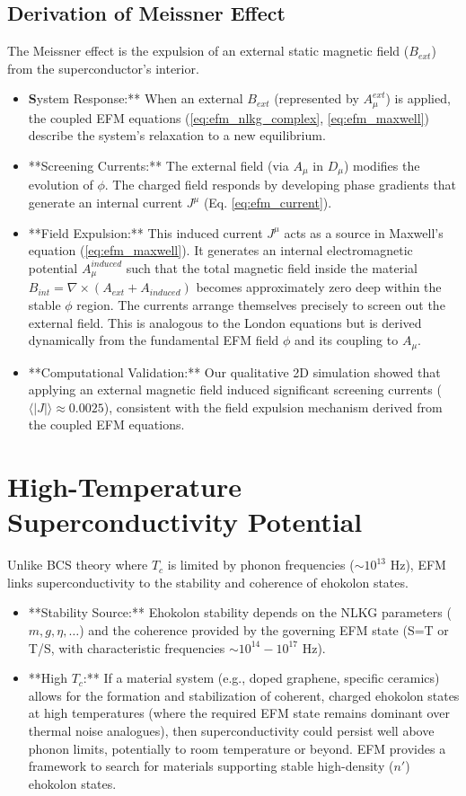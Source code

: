 \documentclass[11pt]{article}
\begin{document}
\subsection{Derivation of Meissner Effect}
The Meissner effect is the expulsion of an external static magnetic field (\(B_{ext}\)) from the superconductor's interior.
\begin{itemize}
    \item \textbf System Response:** When an external \(B_{ext}\) (represented by \(A_\mu^{ext}\)) is applied, the coupled EFM equations (\ref{eq:efm_nlkg_complex}, \ref{eq:efm_maxwell}) describe the system's relaxation to a new equilibrium.
    \item **Screening Currents:** The external field (via \(A_\mu\) in \(D_\mu\)) modifies the evolution of \(\phi\). The charged field responds by developing phase gradients that generate an internal current \(J^\mu\) (Eq. \ref{eq:efm_current}).
    \item **Field Expulsion:** This induced current \(J^\mu\) acts as a source in Maxwell's equation (\ref{eq:efm_maxwell}). It generates an internal electromagnetic potential \(A_\mu^{induced}\) such that the total magnetic field inside the material \(B_{int} = \nabla \times (A_{ext} + A_{induced})\) becomes approximately zero deep within the stable \(\phi\) region. The currents arrange themselves precisely to screen out the external field. This is analogous to the London equations but is derived dynamically from the fundamental EFM field \(\phi\) and its coupling to \(A_\mu\).
    \item **Computational Validation:** Our qualitative 2D simulation showed that applying an external magnetic field induced significant screening currents (\(\langle|J|\rangle \approx 0.0025\)), consistent with the field expulsion mechanism derived from the coupled EFM equations.
\end{itemize}

\section{High-Temperature Superconductivity Potential}
Unlike BCS theory where \(T_c\) is limited by phonon frequencies (\(\sim 10^{13}\) Hz), EFM links superconductivity to the stability and coherence of ehokolon states.
\begin{itemize}
    \item **Stability Source:** Ehokolon stability depends on the NLKG parameters (\(m, g, \eta, \dots\)) and the coherence provided by the governing EFM state (S=T or T/S, with characteristic frequencies \( \sim 10^{14}-10^{17} \) Hz).
    \item **High \(T_c\):** If a material system (e.g., doped graphene, specific ceramics) allows for the formation and stabilization of coherent, charged ehokolon states at high temperatures (where the required EFM state remains dominant over thermal noise analogues), then superconductivity could persist well above phonon limits, potentially to room temperature or beyond. EFM provides a framework to search for materials supporting stable high-density (\(n'\)) ehokolon states.
\end{itemize}
\end{document}
